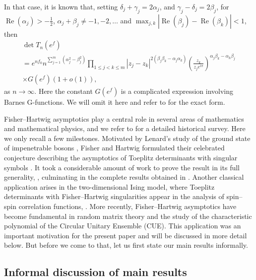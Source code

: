 \documentclass[11pt]{amsart}
\theoremstyle{plain}
\theoremstyle{remark}
\renewcommand{\Re}{\mathop{\mathrm{Re}}}
\numberwithin{equation}{section}
\begin{document}
In that case, it is known that, setting $\delta_j+\gamma_j=2\alpha_j$, and $\gamma_j-\delta_j=2\beta_j$, 
for $\Re(\alpha_j)>-\frac{1}{2}$, $\alpha_j+\beta_j\not= -1, -2,\ldots$  and $\max_{j,k}|\Re(\beta_j)-\Re(\beta_k)|<1$, then
\begin{multline}\label{eq:FH}
\det T_n(e^{f})
\\=
e^{n f_0}
%
n^{\sum_{j=1}^{m}
(\alpha_j^2-\beta_j^2)}
%
\prod_{1\leq j<k\leq m}
\left| z_j-z_k \right|^{2(\beta_j\beta_k-\alpha_j\alpha_k)}\left(\frac{z_k}{z_j e^{i\pi}}\right)^{\alpha_j\beta_k-\alpha_k\beta_j}
\\\times
G(e^f)(1+o(1)),
\end{multline}
as $n \to \infty$. Here the constant $G(e^f)$ is a complicated expression involving Barnes G-functions. We will omit it here and refer to \cite{DIK} for the exact form. 
%
%

Fisher--Hartwig asymptotics play a central role in several areas of mathematics and mathematical physics, and we refer to \cite{DIK} for a detailed historical survey. Here we only recall a few milestones. Motivated by Lenard's study of the ground state of impenetrable bosons \cite{Len1}, Fisher and Hartwig formulated their celebrated conjecture describing the asymptotics of Toeplitz determinants with singular symbols \cite{FisHart1}. 
It took a considerable amount of work to prove the result in its full generality,
\cite{Bas1,Bas3,BasHelt,BottSilb,Wid2}, 
culminating in the complete results obtained in \cite{DIK1,Ehr}.
%
%
Another classical application arises in the two-dimensional Ising model, where Toeplitz determinants with Fisher--Hartwig singularities appear in the analysis of spin--spin correlation functions, \cite{KauOns}. More recently, Fisher--Hartwig asymptotics have become fundamental in random matrix theory and the  study of the  characteristic polynomial of the Circular Unitary Ensemble (CUE). This application was an important motivation for the present paper and will be discussed in more detail below. But before we come to that, let us first state our main results informally.


%
%
%
%

\subsection{Informal discussion of main results}\label{sec:informal}
\end{document}
